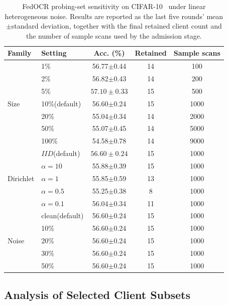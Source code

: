 ﻿\documentclass[conference]{IEEEtran}
\theoremstyle{definition}
\theoremstyle{remark}
\begin{document}
\begin{table}[!t]
	\centering
	\caption{\normalfont FedOCR probing-set sensitivity on CIFAR-10~\cite{krizhevsky2009learning} under linear heterogeneous noise. Results are reported as the last five rounds' mean$\pm$standard deviation, together with the final retained client count and the number of sample scans used by the admission stage.}
	\label{tab:probing_set_sensitivity}
	\setlength{\tabcolsep}{3.6pt}
	\renewcommand{\arraystretch}{1.12}
	\scriptsize
	\begin{tabular}{llccc}
		\toprule
		\textbf{Family} & \textbf{Setting} & \textbf{Acc. (\%)} & \textbf{Retained} & \textbf{Sample scans} \\
		\midrule
		\multirow{7}{*}{Size}
		& 1\%   & 56.77$\pm$0.44 & 14 & 100 \\
		& 2\%   & 56.82$\pm$0.43 & 14 & 200 \\
		& 5\%   & $\boldsymbol{57.10\pm0.33}$ & 15 & 500 \\
		& 10\%(default)  & 56.60$\pm$0.24 & 15 & 1000 \\
		& 20\%  & 55.04$\pm$0.34 & 14 & 2000 \\
		& 50\%  & 55.07$\pm$0.45 & 14 & 5000 \\
		& 100\% & 54.58$\pm$0.78 & 14 & 9000 \\
		\midrule
		\multirow{5}{*}{Dirichlet}
		& $IID$(default) & $\boldsymbol{56.60\pm0.24}$ & 15 & 1000 \\
		& $\alpha=10$ & 55.88$\pm$0.39 & 15 & 1000 \\
		& $\alpha=1$  & 55.85$\pm$0.59 & 13 & 1000 \\
		& $\alpha=0.5$ & 55.25$\pm$0.38 & 8 & 1000 \\
		& $\alpha=0.1$ & 56.04$\pm$0.34 & 11 & 1000 \\
		\midrule
		\multirow{5}{*}{Noise}
		& clean(default) & 56.60$\pm$0.24 & 15 & 1000 \\
		& 10\% & 56.60$\pm$0.24 & 15 & 1000 \\
		& 20\% & 56.60$\pm$0.24 & 15 & 1000 \\
		& 30\% & 56.60$\pm$0.24 & 15 & 1000 \\
		& 50\%& 56.60$\pm$0.24 & 15 & 1000 \\
		\bottomrule
	\end{tabular}
\end{table}


\subsection{Analysis of Selected Client Subsets}
\label{subsec:subset_analysis}
\end{document}
